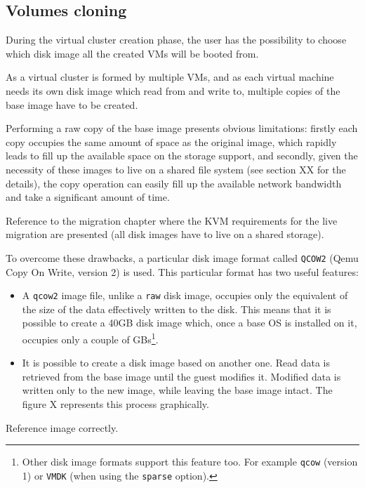 \subsection{Volumes cloning}

During the virtual cluster creation phase, the user has the possibility to choose which disk image all the created VMs will be booted from.

As a virtual cluster is formed by multiple VMs, and as each virtual machine needs its own disk image which read from and write to, multiple copies of the base image have to be created.

Performing a raw copy of the base image presents obvious limitations: firstly each copy occupies the same amount of space as the original image, which rapidly leads to fill up the available space on the storage support, and secondly, given the necessity of these images to live on a shared file system (see section XX for the details), the copy operation can easily fill up the available network bandwidth and take a significant amount of time.

\begin{todo}
Reference to the migration chapter where the KVM requirements for the live migration are presented (all disk images have to live on a shared storage).
\end{todo}

To overcome these drawbacks, a particular disk image format called \texttt{QCOW2} (Qemu Copy On Write, version 2) is used. This particular format has two useful features:

\begin{itemize}
    \item A \texttt{qcow2} image file, unlike a \texttt{raw} disk image, occupies only the equivalent of the size of the data effectively written to the disk. This means that it is possible to create a 40GB disk image which, once a base OS is installed on it, occupies only a couple of GBs\footnote{Other disk image formats support this feature too. For example \texttt{qcow} (version 1) or \texttt{VMDK} (when using the \texttt{sparse} option).}.
    \item It is possible to create a disk image based on another one. Read data is retrieved from the base image until the guest modifies it. Modified data is written only to the new image, while leaving the base image intact. The figure X represents this process graphically.
\end{itemize}

\begin{todo}
Reference image correctly.
\end{todo}

